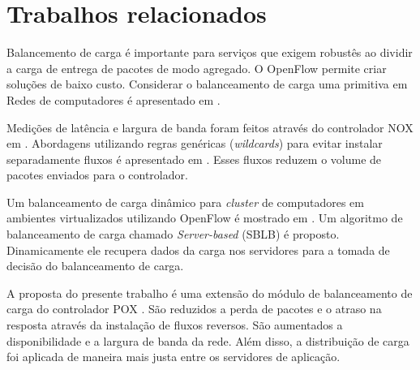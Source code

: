 \section{Trabalhos relacionados}

Balancemento de carga é importante para serviços que exigem robustês ao dividir
a carga de entrega de pacotes de modo agregado.
O OpenFlow permite criar soluções de baixo custo.
Considerar o balanceamento de carga uma primitiva em Redes de computadores é 
apresentado em \cite{nikhil2010asterix}.

Medições de latência e largura de banda foram feitos através do controlador
NOX em \cite{hardeep2010openflow}.
Abordagens utilizando regras genéricas (\emph{wildcards}) para evitar instalar
separadamente fluxos é apresentado em \cite{richard2011openflow}. 
Esses fluxos reduzem o volume de pacotes enviados para o controlador.

Um balanceamento de carga dinâmico para \emph{cluster} de computadores em 
ambientes virtualizados utilizando OpenFlow é mostrado em 
\citep{chen2014design}.
Um algoritmo de balanceamento de carga chamado \emph{Server-based} (SBLB) 
é proposto. 
Dinamicamente ele recupera dados da carga nos servidores para a tomada de 
decisão do balanceamento de carga. 

A proposta do presente trabalho é uma extensão do módulo de balanceamento
de carga do controlador POX \citep{pox2015}.
São reduzidos a perda de pacotes e o atraso na resposta através da instalação
de fluxos reversos. 
São aumentados a disponibilidade e a largura de banda da rede.
Além disso, a distribuição de carga foi aplicada de maneira mais justa entre
os servidores de aplicação.

